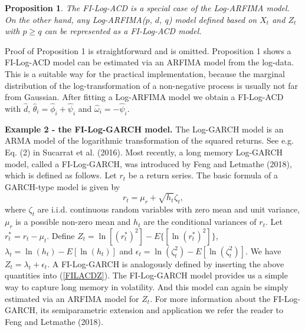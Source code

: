 \documentclass[12pt]{article}
\newtheorem{proposition}{Proposition}
\newtheorem{lemma}{Lemma}
\begin{document}
\begin{proposition}
The FI-Log-ACD is a special case of the Log-ARFIMA model. On the other hand, any Log-ARFIMA($p$, $d$, $q$) model defined based on $X_t$ and $Z_t$ with $p\ge q$ can be represented as a FI-Log-ACD model. 
\end{proposition}
Proof of Proposition 1 is straightforward and is omitted. 
Proposition 1 shows a FI-Log-ACD model can be estimated via an ARFIMA model from the log-data. This is a suitable way for the practical implementation, because the marginal distribution of the log-transformation of a non-negative process is usually not far from Gaussian. After fitting a Log-ARFIMA model we obtain a FI-Log-ACD with $\hat d$, $\hat\theta_i=\hat\phi_i+\hat\psi_i$ and $\hat\omega_i=-\hat\psi_i$. 
   

{\bf Example 2 - the FI-Log-GARCH model.} The Log-GARCH model is an ARMA model of the logarithmic transformation of the squared returns. See e.g. Eq. (2) in Sucarrat et al. (2016). Most recently,  a long memory Log-GARCH model, called a FI-Log-GARCH, was introduced by Feng and Letmathe (2018), which is defined as follows. Let $r_t$ be a return series. The basic formula of a GARCH-type model is given by
\begin{equation}\label{ret}
r_t = \mu_r + \sqrt{h_t} \zeta_t,
\end{equation}
where $\zeta_t$ are i.i.d. continuous random variables with zero mean and unit variance, $\mu_r$ is a possible non-zero mean and $h_t$ are the conditional variances of $r_t$. Let $r_t^*=r_t-\mu_t$. Define $Z_t=\ln[(r_t^*)^2]-E\{[\ln(r_t^*)^2]\}$, $\lambda_t=\ln(h_t)-E[\ln(h_t)]$ and $\epsilon_t=\ln(\zeta_t^2)-E[\ln(\zeta_t^2)]$. We have $Z_t=\lambda_t+\epsilon_t$. A FI-Log-GARCH is analogously defined by inserting the above quantities into (\ref{FILACDZ}). 
The FI-Log-GARCH model provides us a simple way to capture long memory in volatility. And this model can again be simply estimated via an ARFIMA model for $Z_t$. For more information about the FI-Log-GARCH, its semiparametric extension and application we refer the reader to Feng and Letmathe (2018). 
\end{document}
